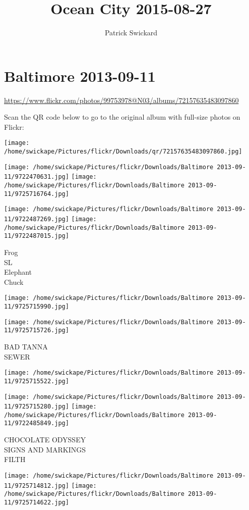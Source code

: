 \documentclass[10pt,letterpaper]{article}
\title{Ocean City 2015-08-27}
\author{Patrick Swickard}
\date{}
\begin{document}
\section*{Baltimore 2013-09-11}

\url{https://www.flickr.com/photos/99753978@N03/albums/72157635483097860}

Scan the QR code below to go to the original album with full-size photos on Flickr:

\texttt{[image: /home/swickape/Pictures/flickr/Downloads/qr/72157635483097860.jpg]}
\pagebreak

\texttt{[image: /home/swickape/Pictures/flickr/Downloads/Baltimore 2013-09-11/9722470631.jpg]}
\texttt{[image: /home/swickape/Pictures/flickr/Downloads/Baltimore 2013-09-11/9725716764.jpg]}

\texttt{[image: /home/swickape/Pictures/flickr/Downloads/Baltimore 2013-09-11/9722487269.jpg]}
\texttt{[image: /home/swickape/Pictures/flickr/Downloads/Baltimore 2013-09-11/9722487015.jpg]}

Frog\\
SL\\
Elephant\\
Chuck
\pagebreak

\texttt{[image: /home/swickape/Pictures/flickr/Downloads/Baltimore 2013-09-11/9725715990.jpg]}

\vspace{0.25in}
\texttt{[image: /home/swickape/Pictures/flickr/Downloads/Baltimore 2013-09-11/9725715726.jpg]}

BAD TANNA\\
SEWER
\pagebreak

\texttt{[image: /home/swickape/Pictures/flickr/Downloads/Baltimore 2013-09-11/9725715522.jpg]}

\vspace{0.25in}
\texttt{[image: /home/swickape/Pictures/flickr/Downloads/Baltimore 2013-09-11/9725715280.jpg]}
\texttt{[image: /home/swickape/Pictures/flickr/Downloads/Baltimore 2013-09-11/9722485849.jpg]}

CHOCOLATE ODYSSEY\\
SIGNS AND MARKINGS\\
FILTH
\pagebreak

\texttt{[image: /home/swickape/Pictures/flickr/Downloads/Baltimore 2013-09-11/9725714812.jpg]}
\texttt{[image: /home/swickape/Pictures/flickr/Downloads/Baltimore 2013-09-11/9725714622.jpg]}
\end{document}
